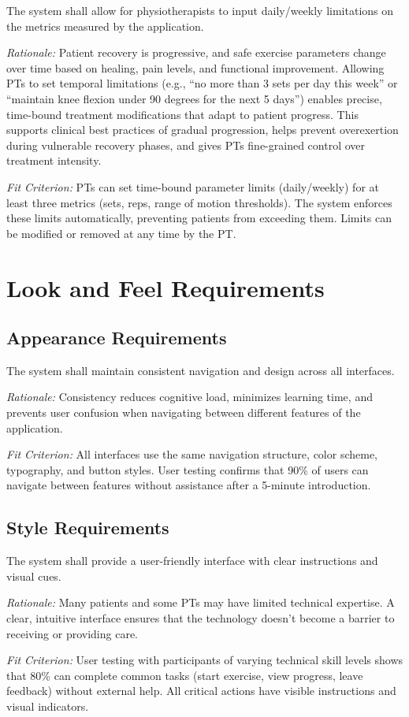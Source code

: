 \documentclass[12pt]{article}
\newcommand{\rationale}[1]{\par\emph{Rationale:} #1}
\newcommand{\fitcrit}[1]{\par\emph{Fit Criterion:} #1}
\begin{document}
\begin{reqlist}
	\item[FR 27.] The system shall allow for physiotherapists to input daily/weekly limitations on the metrics measured by the application.
	\rationale{Patient recovery is progressive, and safe exercise parameters change over time based on healing, pain levels, and functional improvement. Allowing PTs to set temporal limitations (e.g., ``no more than 3 sets per day this week'' or ``maintain knee flexion under 90 degrees for the next 5 days'') enables precise, time-bound treatment modifications that adapt to patient progress. This supports clinical best practices of gradual progression, helps prevent overexertion during vulnerable recovery phases, and gives PTs fine-grained control over treatment intensity.}
	\fitcrit{PTs can set time-bound parameter limits (daily/weekly) for at least three metrics (sets, reps, range of motion thresholds). The system enforces these limits automatically, preventing patients from exceeding them. Limits can be modified or removed at any time by the PT.}
	
\end{reqlist}

\section{Look and Feel Requirements}

\subsection{Appearance Requirements}
\begin{reqlist}
	\item[LFR-AP 1.] The system shall maintain consistent navigation and design across all interfaces.
	\rationale{Consistency reduces cognitive load, minimizes learning time, and prevents user confusion when navigating between different features of the application.}
	\fitcrit{All interfaces use the same navigation structure, color scheme, typography, and button styles. User testing confirms that 90\% of users can navigate between features without assistance after a 5-minute introduction.}
\end{reqlist}

\subsection{Style Requirements}
\begin{reqlist}
	\item[LFR-ST 1.] The system shall provide a user-friendly interface with clear instructions and visual cues.
	\rationale{Many patients and some PTs may have limited technical expertise. A clear, intuitive interface ensures that the technology doesn't become a barrier to receiving or providing care.}
	\fitcrit{User testing with participants of varying technical skill levels shows that 80\% can complete common tasks (start exercise, view progress, leave feedback) without external help. All critical actions have visible instructions and visual indicators.}
\end{reqlist}
\end{document}
